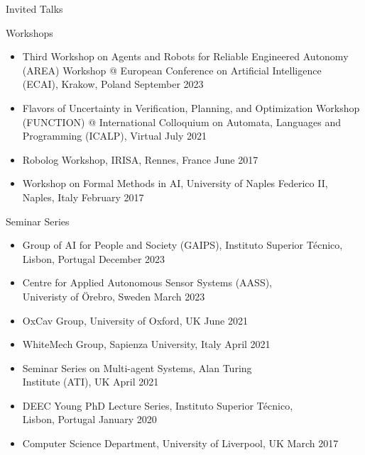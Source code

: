 
\begin{rSection}{Invited Talks}
   \item Workshops
   \begin{itemize}
   \item Third Workshop on Agents and Robots for Reliable Engineered Autonomy \\ (AREA) Workshop @ European Conference on Artificial Intelligence \\(ECAI), Krakow, Poland \hfill September 2023
   \item Flavors of Uncertainty in Verification, Planning, and Optimization  Workshop \\ (FUNCTION) @ International Colloquium on Automata, Languages
and \\ Programming (ICALP), Virtual \hfill July 2021

\item  Robolog Workshop, IRISA, Rennes, France \hfill June 2017
\item Workshop on Formal Methods in AI, University of Naples Federico II,\\ Naples, Italy \hfill February 2017 
	\end{itemize}

\item Seminar Series
\begin{itemize}
  \item Group of AI for People and Society (GAIPS), Instituto Superior T\'{e}cnico, \\Lisbon, Portugal \hfill December 2023
  \item Centre for Applied Autonomous Sensor Systems (AASS), \\Univeristy of \"Orebro, Sweden \hfill March 2023
  \item OxCav Group, University of Oxford, UK \hfill June 2021
  \item WhiteMech  Group, Sapienza University, Italy \hfill April 2021
  \item Seminar Series on Multi-agent Systems, Alan Turing\\ Institute (ATI), UK \hfill April 2021   
  \item DEEC Young PhD  Lecture Series, Instituto Superior T\'{e}cnico,\\ Lisbon, Portugal \hfill January 2020
  \item Computer Science Department, University of Liverpool, UK \hfill March 2017
\end{itemize}
\end{rSection}
